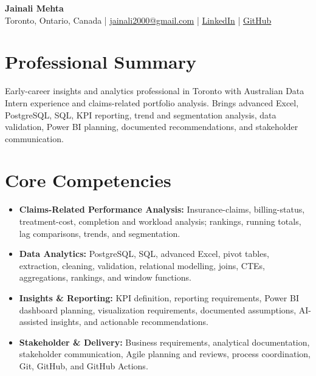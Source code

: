 \documentclass[letterpaper,10pt]{article}
\begin{document}
\begin{center}
  {\fontsize{17}{19}\selectfont\textbf{Jainali Mehta}}\\[2pt]
  \small Toronto, Ontario, Canada \;|\;
  \href{mailto:jainali2000@gmail.com}{jainali2000@gmail.com} \;|\;
  \href{https://www.linkedin.com/in/jainali-mehta}{LinkedIn} \;|\;
  \href{https://github.com/jainalimehta}{GitHub}
\end{center}
\vspace{-7pt}

\section{Professional Summary}
\small Early-career insights and analytics professional in Toronto with Australian Data Intern experience and claims-related portfolio analysis. Brings advanced Excel, PostgreSQL, SQL, KPI reporting, trend and segmentation analysis, data validation, Power BI planning, documented recommendations, and stakeholder communication.

\section{Core Competencies}
\begin{itemize}[leftmargin=0.16in,label=\textbullet,topsep=0pt,itemsep=1pt,parsep=0pt]
  \item \small \textbf{Claims-Related Performance Analysis:} Insurance-claims, billing-status, treatment-cost, completion and workload analysis; rankings, running totals, lag comparisons, trends, and segmentation.
  \item \small \textbf{Data Analytics:} PostgreSQL, SQL, advanced Excel, pivot tables, extraction, cleaning, validation, relational modelling, joins, CTEs, aggregations, rankings, and window functions.
  \item \small \textbf{Insights \& Reporting:} KPI definition, reporting requirements, Power BI dashboard planning, visualization requirements, documented assumptions, AI-assisted insights, and actionable recommendations.
  \item \small \textbf{Stakeholder \& Delivery:} Business requirements, analytical documentation, stakeholder communication, Agile planning and reviews, process coordination, Git, GitHub, and GitHub Actions.
\end{itemize}
\end{document}
